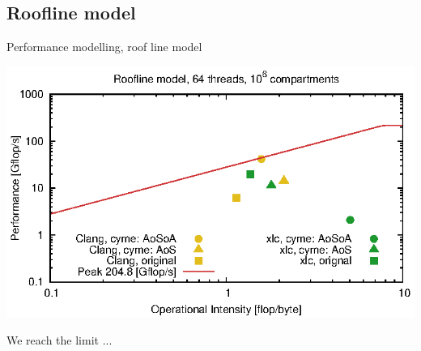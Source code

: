 \documentclass{beamer}
\begin{document}
%
%
%
%
%
%


\subsection*{Roofline model}
\begin{frame}[fragile]
\begin{center}

Performance modelling, roof line model

\vspace{0.5cm}


   \includegraphics[scale=0.8]{bench.eps}

We reach the limit ...
\end{center}
\end{frame}
\end{document}
